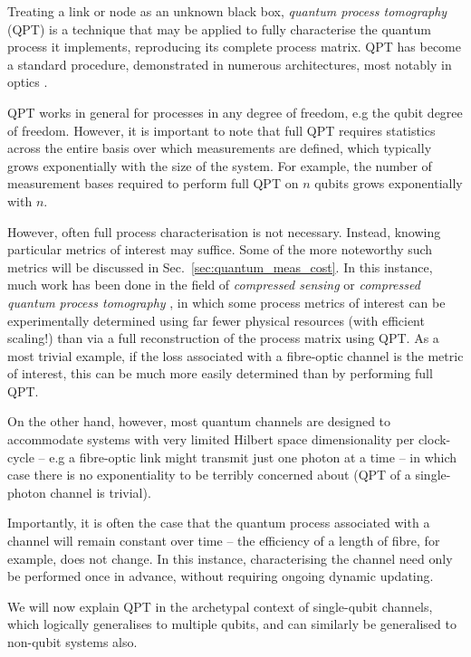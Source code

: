 \documentclass[aps,rmp,twocolumn,amsmath,amssymb,nofootinbib,superscriptaddress,longbibliography,floatfix]{revtex4-1}
\begin{document}
Treating a link or node as an unknown black box, \emph{quantum process tomography} (QPT) \cite{bib:ChuangNielsen97, ???} is a technique that may be applied to fully characterise the quantum process it implements, reproducing its complete process matrix. QPT has become a standard procedure, demonstrated in numerous architectures, most notably in optics \cite{bib:OBrien04, bib:RohdeGateChar05}.

QPT works in general for processes in any degree of freedom, e.g the qubit degree of freedom. However, it is important to note that full QPT requires statistics across the entire basis over which measurements are defined, which typically grows exponentially with the size of the system. For example, the number of measurement bases required to perform full QPT on $n$ qubits grows exponentially with $n$.

However, often full process characterisation is not necessary. Instead, knowing particular metrics of interest may suffice. Some of the more noteworthy such metrics will be discussed in Sec.~\ref{sec:quantum_meas_cost}. In this instance, much work has been done in the field of \emph{compressed sensing} or \emph{compressed quantum process tomography} \cite{??? compressed_sensing}, in which some process metrics of interest can be experimentally determined using far fewer physical resources (with efficient scaling!) than via a full reconstruction of the process matrix using QPT. As a most trivial example, if the loss associated with a fibre-optic channel is the metric of interest, this can be much more easily determined than by performing full QPT.

On the other hand, however, most quantum channels are designed to accommodate systems with very limited Hilbert space dimensionality per clock-cycle -- e.g a fibre-optic link might transmit just one photon at a time -- in which case there is no exponentiality to be terribly concerned about (QPT of a single-photon channel is trivial).

Importantly, it is often the case that the quantum process associated with a channel will remain constant over time -- the efficiency of a length of fibre, for example, does not change. In this instance, characterising the channel need only be performed once in advance, without requiring ongoing dynamic updating.

We will now explain QPT in the archetypal context of single-qubit channels, which logically generalises to multiple qubits, and can similarly be generalised to non-qubit systems also.
\end{document}
